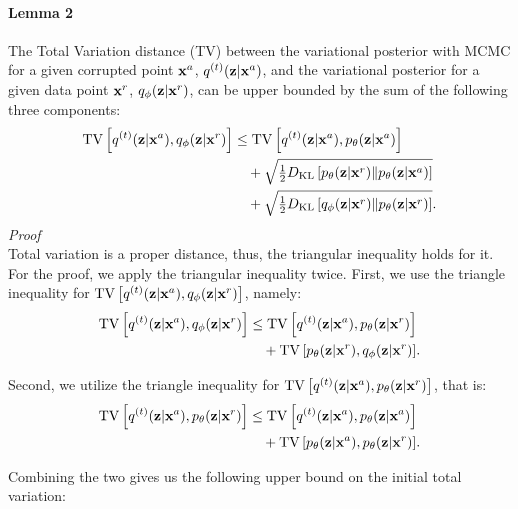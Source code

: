 \paragraph{Lemma 2}
The Total Variation distance (TV) between the variational posterior with MCMC for a given corrupted point ${\mathbf{x}}^a$, $q^{(t)}({\mathbf{z}}|{\mathbf{x}}^a)$, and the variational posterior for a given data point ${\mathbf{x}}^r$, $q_{\phi}({\mathbf{z}}|{\mathbf{x}}^r)$, can be upper bounded by the sum of the following three components:
\begin{equation}
    \begin{aligned}
{\mathrm{TV}\left[q^{(t)}({\mathbf{z}}|{\mathbf{x}}^a) ,q_{\phi}({\mathbf{z}}|{\mathbf{x}}^r) \right]} &\leq 
    {\mathrm{TV}\left[q^{(t)}({\mathbf{z}}|{\mathbf{x}}^a) ,p_{\theta}({\mathbf{z}}|{\mathbf{x}}^a) \right]} \\
     &\quad+ 
    \sqrt{\tfrac12 D_{\mathrm{KL}}\left[p_{\theta}({\mathbf{z}}|{\mathbf{x}}^r)\|p_{\theta}({\mathbf{z}}|{\mathbf{x}}^a)\right]  } \\
    &\quad+
   \sqrt{\tfrac12  D_{\mathrm{KL}}\left[q_{\phi}({\mathbf{z}}|{\mathbf{x}}^r)\|p_{\theta}({\mathbf{z}}|{\mathbf{x}}^r)\right]}.
    \end{aligned}
\end{equation}
\textit{Proof}\\
Total variation is a proper distance, thus, the triangular inequality holds for it. For the proof, we apply the triangular inequality twice. First, we use the triangle inequality for $\text{TV}\left[ q^{(t)}({\mathbf{z}}|{\mathbf{x}}^a), q_{\phi}({\mathbf{z}}|{\mathbf{x}}^r) \right]$, namely: 
\begin{equation}
    \begin{aligned}
    {\mathrm{TV}\left[q^{(t)}({\mathbf{z}}|{\mathbf{x}}^a) ,q_{\phi}({\mathbf{z}}|{\mathbf{x}}^r) \right]} &\leq 
    {\mathrm{TV}\left[q^{(t)}({\mathbf{z}}|{\mathbf{x}}^a) ,p_{\theta}({\mathbf{z}}|{\mathbf{x}}^r) \right]}  \\
    &\quad+ {\mathrm{TV}\left[p_{\theta}({\mathbf{z}}|{\mathbf{x}}^r) ,q_{\phi}({\mathbf{z}}|{\mathbf{x}}^r) \right]}.        
    \end{aligned}
\end{equation}

Second, we utilize the triangle inequality for ${\mathrm{TV}\left[q^{(t)}({\mathbf{z}}|{\mathbf{x}}^a) ,p_{\theta}({\mathbf{z}}|{\mathbf{x}}^r)  \right]}$, that is:
\begin{equation}
    \begin{aligned}
    {\mathrm{TV}\left[q^{(t)}({\mathbf{z}}|{\mathbf{x}}^a) ,p_{\theta}({\mathbf{z}}|{\mathbf{x}}^r) \right]}
    &\leq 
    {\mathrm{TV}\left[q^{(t)}({\mathbf{z}}|{\mathbf{x}}^a) ,p_{\theta}({\mathbf{z}}|{\mathbf{x}}^a) \right]}  \\
     &\quad+ {\mathrm{TV}\left[p_{\theta}({\mathbf{z}}|{\mathbf{x}}^a) ,p_{\theta}({\mathbf{z}}|{\mathbf{x}}^r) \right]} .
    \end{aligned}
\end{equation}

Combining the two gives us the following upper bound on the initial total variation:

